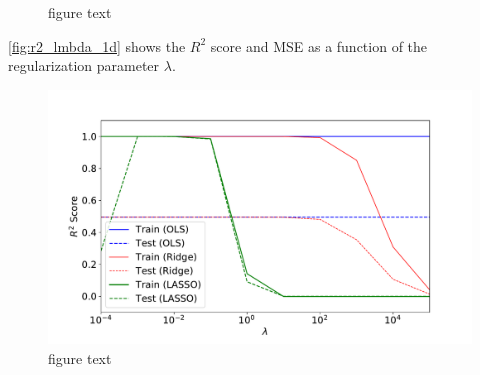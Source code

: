 \begin{figure}[H]
\qquad
{}
\qquad
{}
\caption{figure text}
\label{fig:j_lmbda}
\end{figure}


\autoref{fig:r2_lmbda_1d} shows the $R^2$ score and MSE as a function of the regularization parameter $\lambda$.

\begin{figure}[H]
\begin{center}\includegraphics[scale=0.5]{latex/figures/ising1D_r2_vs_lmbda.pdf}
\end{center}
\caption{figure text}
\label{fig:r2_lmbda_1d}
\end{figure}

